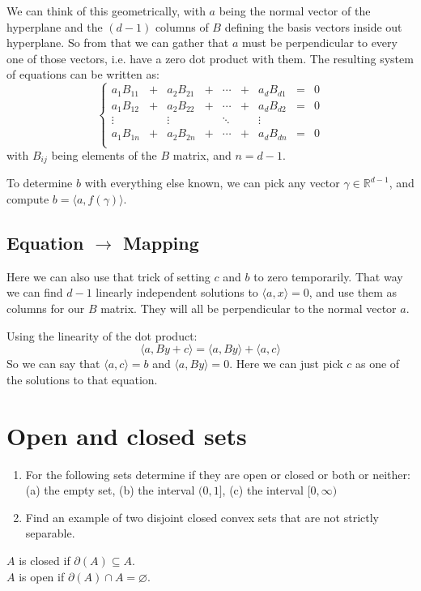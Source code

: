 \documentclass{article}
\let\emptyset\varnothing
\newcommand{\R}{\mathbb{R}}
\begin{document}
  We can think of this geometrically,
  with $a$ being the normal vector of the hyperplane and the $(d-1)$ columns of $B$ defining the basis vectors inside out hyperplane.
  So from that we can gather that $a$ must be perpendicular to every one of those vectors, i.e. have a zero dot product with them.
  The resulting system of equations can be written as:
  \[
    \left\{
    \begin{matrix}
      a_1 B_{11} &+& a_2 B_{21} &+& \cdots &+& a_d B_{d1} &=& 0 \\
      a_1 B_{12} &+& a_2 B_{22} &+& \cdots &+& a_d B_{d2} &=& 0 \\
      \vdots     && \vdots      && \ddots  && \vdots  \\
      a_1 B_{1n} &+& a_2 B_{2n} &+& \cdots &+& a_d B_{dn} &=& 0 \\
    \end{matrix}
    \right.
  \]
  with $B_{ij}$ being elements of the $B$ matrix, and $n = d-1$.

  To determine $b$ with everything else known, we can pick any vector $\gamma \in \R^{d-1}$, and compute $b = \langle a,f(\gamma) \rangle$.

  \subsection{Equation $\to$ Mapping}
  Here we can also use that trick of setting $c$ and $b$ to zero temporarily.
  That way we can find $d-1$ linearly independent solutions to $\langle a,x \rangle = 0$, and use them as columns for our $B$ matrix.
  They will all be perpendicular to the normal vector $a$.

  Using the linearity of the dot product:
  \[
    \langle a, By + c \rangle = \langle a, By \rangle + \langle a, c \rangle
  \]
  So we can say that $\langle a, c \rangle = b$ and $\langle a, By \rangle = 0$.
  Here we can just pick $c$ as one of the solutions to that equation.


  \section{Open and closed sets}
  \begin{centerframebox}
    \begin{enumerate}[label=(\roman*)]
      \item For the following sets determine if they are open or closed or both or neither:
      (a) the empty set, (b) the interval $(0, 1]$, (c) the interval $[0, \infty)$
      \item Find an example of two disjoint closed convex sets that are not strictly separable.
    \end{enumerate}

    $A$ is closed if $\partial(A) \subseteq A$. \\
    $A$ is open if $\partial(A) \cap A = \emptyset$.
  \end{centerframebox}
\end{document}

